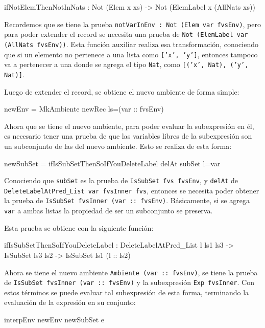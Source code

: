 \begin{code}
ifNotElemThenNotInNats : Not (Elem x xs) ->
  Not (ElemLabel x (AllNats xs))
\end{code}

Recordemos que se tiene la prueba \texttt{notVarInEnv : Not (Elem var fvsEnv)}, pero para poder extender el record se necesita una prueba de \texttt{Not (ElemLabel var (AllNats fvsEnv))}. Esta función auxiliar realiza esa transformación, conociendo que si un elemento no pertenece a una lista como \texttt{['x', 'y']}, entonces tampoco va a pertenecer a una donde se agrega el tipo \texttt{Nat}, como \texttt{[('x', Nat), ('y', Nat)]}.

Luego de extender el record, se obtiene el nuevo ambiente de forma simple:

\begin{code}
newEnv = MkAmbiente newRec {ls=(var :: fvsEnv)}
\end{code}

Ahora que se tiene el nuevo ambiente, para poder evaluar la subexpresión en él, es necesario tener una prueba de que las variables libres de la subexpresión son un subconjunto de las del nuevo ambiente. Esto se realiza de esta forma:

\begin{code}
newSubSet =
  ifIsSubSetThenSoIfYouDeleteLabel delAt subSet {l=var}
\end{code}

Conociendo que \texttt{subSet} es la prueba de \texttt{IsSubSet fvs fvsEnv}, y \texttt{delAt} de \texttt{DeleteLabelAtPred\_List var fvsInner fvs}, entonces se necesita poder obtener la prueba de \texttt{IsSubSet fvsInner (var :: fvsEnv)}. Básicamente, si se agrega \texttt{var} a ambas listas la propiedad de ser un subconjunto se preserva.

Esta prueba se obtiene con la siguiente función:

\begin{code}
ifIsSubSetThenSoIfYouDeleteLabel :
  DeleteLabelAtPred_List l ls1 ls3 ->
  IsSubSet ls3 ls2 -> IsSubSet ls1 (l :: ls2)
\end{code}

Ahora se tiene el nuevo ambiente \texttt{Ambiente (var :: fvsEnv)}, se tiene la prueba de \texttt{IsSubSet fvsInner (var :: fvsEnv)} y la subexpresión \texttt{Exp fvsInner}. Con estos términos se puede evaluar tal subexpresión de esta forma, terminando la evaluación de la expresión en su conjunto:

\begin{code}
interpEnv newEnv newSubSet e
\end{code}

